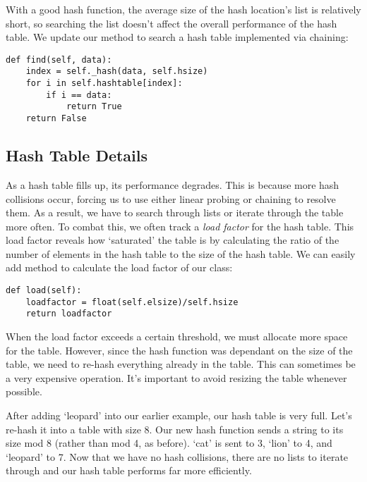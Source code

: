 With a good hash function, the average size of the hash location's list is relatively short, so searching the list doesn't affect the overall performance of the hash table.
We update our  method to search a hash table implemented via chaining:
\begin{lstlisting}
def find(self, data):
    index = self._hash(data, self.hsize)
    for i in self.hashtable[index]:
        if i == data:
            return True
    return False
\end{lstlisting}

\subsection*{Hash Table Details}
As a hash table fills up, its performance degrades.
This is because more hash collisions occur, forcing us to use either linear probing or chaining to resolve them.
As a result, we have to search through lists or iterate through the table more often.
To combat this, we often track a \emph{load factor} for the hash table.
This load factor reveals how `saturated' the table is by calculating the ratio of the number of elements in the hash table to the size of the hash table.
We can easily add method to calculate the load factor of our  class:
\begin{lstlisting}
def load(self):
    loadfactor = float(self.elsize)/self.hsize
    return loadfactor
\end{lstlisting}

When the load factor exceeds a certain threshold, we must allocate more space for the table.
However, since the hash function was dependant on the size of the table, we need to re-hash everything already in the table.
This can sometimes be a very expensive operation.
It's important to avoid resizing the table whenever possible.

After adding `leopard' into our earlier example, our hash table is very full. Let's re-hash it into a table with size 8.
Our new hash function sends a string to its size mod 8 (rather than mod 4, as before).
`cat' is sent to 3, `lion' to 4, and `leopard' to 7.
Now that we have no hash collisions, there are no lists to iterate through and our hash table performs far more efficiently.
\begin{center}
\end{center}

